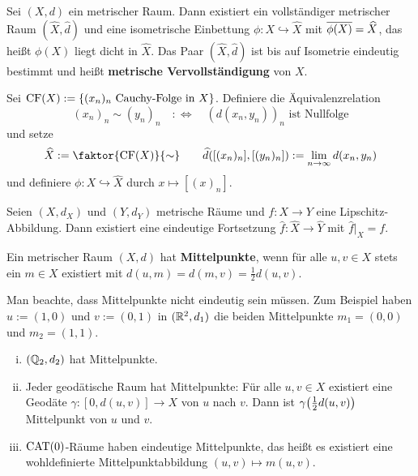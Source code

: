 \begin{erinnerung}
\label{erin:1.31}
	Sei $(X,d)$ ein metrischer Raum.
	Dann existiert ein vollständiger metrischer Raum $(\widehat{X},\widehat{d})$ und eine isometrische Einbettung $\phi\colon X \hookrightarrow \widehat{X}$ mit $\overline{\phi(X)} = \widehat{X}$, das heißt $\phi(X)$ liegt dicht in $\widehat{X}$.
	Das Paar $(\widehat{X},\widehat{d})$ ist bis auf Isometrie eindeutig bestimmt und heißt \textbf{metrische Vervollständigung} von $X$. 
\end{erinnerung}

\begin{beweis}[Skizze]
	Sei $\operatorname{CF}(X) := \{ (x_n)_n \text{ Cauchy-Folge in } X\}$. Definiere die Äquivalenzrelation
	\[
		(x_n)_n \sim (y_n)_n \quad :\Leftrightarrow \quad (d(x_n,y_n))_n \text{ ist Nullfolge}
	\]
	und setze
	\[
		\widehat{X} := \faktor{\CF(X)}{\sim} \qquad \widehat{d}([(x_n)_n],[(y_n)_n]) := \lim\limits_{n \rightarrow \infty} d(x_n,y_n)
	\]
	und definiere $\phi \colon X \hookrightarrow \widehat{X}$ durch $x \mapsto [(x)_n]$. 
\end{beweis}

\begin{erinnerung}
\label{erin:1.32}
	Seien $(X,d_X)$ und $(Y,d_Y)$ metrische Räume und $f \colon X \rightarrow Y$ eine Lipschitz-Abbildung. 
	Dann existiert eine eindeutige Fortsetzung $\widehat{f}\colon \widehat{X} \rightarrow \widehat{Y}$ mit $\widehat{f}\big|_X = f$.
\end{erinnerung}

\begin{definition}[Mittelpunkt]
\label{def:1.33}
	Ein metrischer Raum $(X,d)$ hat \textbf{Mittelpunkte}, wenn für alle $u,v \in X$ stets ein $m \in X$ existiert mit $d(u,m) = d(m,v) = \frac{1}{2}d(u,v)$. 
\end{definition}

Man beachte, dass Mittelpunkte nicht eindeutig sein müssen. Zum Beispiel haben $u := (1,0)$ und $v:= (0,1)$ in $(\mathbb{R}^2,d_1)$ die beiden Mittelpunkte $m_1 = (0,0)$ und $m_2 = (1,1)$.

\begin{beispiel}
\label{bsp:1.34}
	\begin{enumerate}[(i)]
		\item $(\mathbb{Q}_2,d_2)$ hat Mittelpunkte.
		\item Jeder geodätische Raum hat Mittelpunkte: Für alle $u,v \in X$ existiert eine Geodäte $\gamma\colon [0,d(u,v)] \rightarrow X$ von $u$ nach $v$. Dann ist $\gamma\enbrace*{\frac{1}{2} d(u,v)}$ Mittelpunkt von $u$ und $v$.
		\item $\operatorname{CAT(0)}$-Räume haben eindeutige Mittelpunkte, das heißt es existiert eine wohldefinierte Mittelpunktabbildung $(u,v) \mapsto m(u,v)$.
	\end{enumerate}
\end{beispiel}

